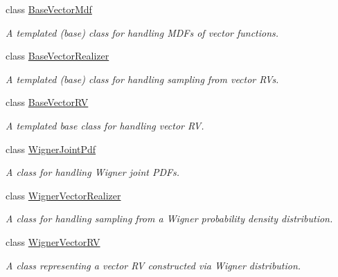 \begin{DoxyCompactItemize}
class \hyperlink{class_q_u_e_s_o_1_1_base_vector_mdf}{Base\-Vector\-Mdf}
\begin{DoxyCompactList}\small\item\em A templated (base) class for handling M\-D\-Fs of vector functions. \end{DoxyCompactList}\item 
class \hyperlink{class_q_u_e_s_o_1_1_base_vector_realizer}{Base\-Vector\-Realizer}
\begin{DoxyCompactList}\small\item\em A templated (base) class for handling sampling from vector R\-Vs. \end{DoxyCompactList}\item 
class \hyperlink{class_q_u_e_s_o_1_1_base_vector_r_v}{Base\-Vector\-R\-V}
\begin{DoxyCompactList}\small\item\em A templated base class for handling vector R\-V. \end{DoxyCompactList}\item 
class \hyperlink{class_q_u_e_s_o_1_1_wigner_joint_pdf}{Wigner\-Joint\-Pdf}
\begin{DoxyCompactList}\small\item\em A class for handling Wigner joint P\-D\-Fs. \end{DoxyCompactList}\item 
class \hyperlink{class_q_u_e_s_o_1_1_wigner_vector_realizer}{Wigner\-Vector\-Realizer}
\begin{DoxyCompactList}\small\item\em A class for handling sampling from a Wigner probability density distribution. \end{DoxyCompactList}\item 
class \hyperlink{class_q_u_e_s_o_1_1_wigner_vector_r_v}{Wigner\-Vector\-R\-V}
\begin{DoxyCompactList}\small\item\em A class representing a vector R\-V constructed via Wigner distribution. \end{DoxyCompactList}\end{DoxyCompactItemize}
